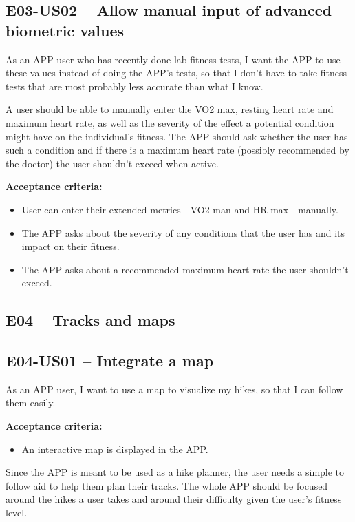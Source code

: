 \subsection*{E03-US02 -- Allow manual input of advanced biometric values}
As an APP user who has recently done lab fitness tests, I want the APP to use these values instead of doing the APP's tests, so that I don't have to take fitness tests that are most probably less accurate than what I know.

A user should be able to manually enter the VO2 max, resting heart rate and maximum heart rate, as well as the severity of the effect a potential condition might have on the individual's fitness.
The APP should ask whether the user has such a condition and if there is a maximum heart rate (possibly recommended by the doctor) the user shouldn't exceed when active.

\textbf{Acceptance criteria:}
\begin{itemize}
    \item User can enter their extended metrics - VO2 man and HR max - manually.
    \item The APP asks about the severity of any conditions that the user has and its impact on their fitness.
    \item The APP asks about a recommended maximum heart rate the user shouldn't exceed.
\end{itemize}
\subsection*{E04 -- Tracks and maps}

\subsection*{E04-US01 -- Integrate a map}
As an APP user, I want to use a map to visualize my hikes, so that I can follow them easily.

\textbf{Acceptance criteria:}
\begin{itemize}
    \item An interactive map is displayed in the APP.
\end{itemize}

Since the APP is meant to be used as a hike planner, the user needs a simple to follow aid to help them plan their tracks.
The whole APP should be focused around the hikes a user takes and around their difficulty given the user's fitness level.

